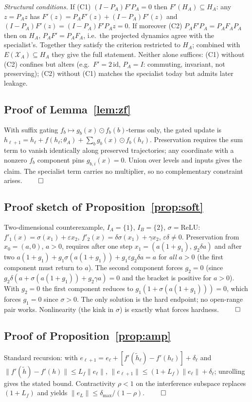\documentclass[11pt]{article}
\theoremstyle{definition}\newtheorem{definition}{Definition}
\theoremstyle{remark}\newtheorem{remark}{Remark}
\newcommand{\Xa}{\mathcal{X}_A}
\begin{document}
\emph{Structural conditions.} If (C1) $(I-P_A)F'P_A=0$ then $F'(H_A)\subseteq H_A$: any
$z=P_Az$ has $F'(z)=P_AF'(z)+(I-P_A)F'(z)$ and $(I-P_A)F'(z)=(I-P_A)F'P_Az=0$. If moreover
(C2) $P_AF'P_A=P_AF_AP_A$ then on $H_A$, $P_AF'=P_AF_A$, i.e.\ the projected dynamics agree
with the specialist's. Together they satisfy the criterion restricted to $H_A$; combined
with $E(\Xa)\subseteq H_A$ they give the full statement. Neither alone suffices: (C1)
without (C2) confines but alters (e.g.\ $F'=2\,\mathrm{id}$, $P_A=I$: commuting, invariant,
not preserving); (C2) without (C1) matches the specialist today but admits later leakage.

\subsection{Proof of Lemma~\ref{lem:zf}}
With suffix gating $f_b\mapsto g_b(x)\odot f_b(b)$-terms only, the gated update is
$h_{\ell+1}=h_\ell+f(h_\ell;\theta_A)+\sum_b g_b(x)\odot f_b(h_\ell)$. Preservation
requires the sum term to vanish identically along preserved trajectories; any coordinate
with a nonzero $f_b$ component pins $g_{b,i}(x)=0$. Union over levels and inputs gives the
claim. The specialist term carries no multiplier, so no complementary constraint arises.
\hfill$\qed$

\subsection{Proof sketch of Proposition~\ref{prop:soft}}
Two-dimensional counterexample, $I_A=\{1\}$, $I_B=\{2\}$, $\sigma=\mathrm{ReLU}$:
$f'_1(x)=\sigma(x_1)+\varepsilon x_2$, $f'_2(x)=\delta\sigma(x_1)+\gamma x_2$,
$\varepsilon\delta\neq0$. Preservation from $x_0=(a,0)$, $a>0$, requires after one step
$x_1=(a(1{+}g_1),\,g_2\delta a)$ and after two
$a(1{+}g_1)+g_1\sigma(a(1{+}g_1))+g_1\varepsilon g_2\delta a=a$ for \emph{all} $a>0$ (the
first component must return to $a$). The second component forces $g_2=0$ (since
$g_2\delta(a+\sigma(a(1{+}g_1))+g_2\gamma a)=0$ and the bracket is positive for $a>0$). With
$g_2=0$ the first component reduces to $g_1(1+\sigma(a(1{+}g_1)))=0$, which forces $g_1=0$
since $\sigma>0$. The only solution is the hard endpoint; no open-range pair works.
Nonlinearity (the kink in $\sigma$) is exactly what forces hardness.
\hfill$\qed$

\subsection{Proof of Proposition~\ref{prop:amp}}
Standard recursion: with $e_{\ell+1}=e_\ell+[f'(\tilde h_\ell)-f'(h_\ell)]+\delta_\ell$ and
$\|f'(\tilde h)-f'(h)\|\le L_f\|e_\ell\|$,
$\|e_{\ell+1}\|\le(1+L_f)\|e_\ell\|+\delta_\ell$; unrolling gives the stated bound.
Contractivity $\rho<1$ on the interference subspace replaces $(1+L_f)$ and yields
$\|e_L\|\le\delta_{\max}/(1-\rho)$. \hfill$\qed$
\end{document}
